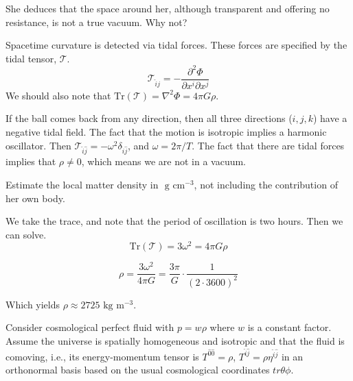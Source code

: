 \documentclass[11pt,largemargins]{homework}
\begin{document}
\begin{alphaparts}
\questionpart
She deduces that the space around her, although transparent and offering no resistance, is not a true vacuum.  Why not?

Spacetime curvature is detected via tidal forces.  These forces are specified by the tidal tensor, $\mathcal{T}$.  $$\mathcal{T}_{\hat{i}\hat{j}} = - \frac{\partial^2 \Phi}{\partial x^i \partial x^j} $$ We should also note that $\mathrm{Tr}(\mathcal{T}) = \nabla^2 \Phi = 4 \pi G \rho$.

If the ball comes back from any direction, then all three directions ($i, j, k$) have a negative tidal field.  The fact that the motion is isotropic implies a harmonic oscillator.  Then $\mathcal{T}_{\hat{i} \hat{j}} = -\omega^2 \delta_{\hat{i} \hat{j}}$, and $\omega = 2\pi / T$.  The fact that there are tidal forces implies that $\rho \neq 0$, which means we are not in a vacuum. 

\questionpart
Estimate the local matter density in $\mbox{ g}\mbox{ cm}^{-3}$, not including the contribution of her own body. 

We take the trace, and note that the period of oscillation is two hours.  Then we can solve.
$$\mathrm{Tr}(\mathcal{T}) = 3 \omega^2 = 4 \pi G \rho$$

$$\rho = \frac{3 \omega^2}{4 \pi G} = \frac{3 \pi}{G} \cdot \frac{1}{(2 \cdot 3600)^2} $$

Which yields
$\rho \approx 2725 \mbox{ kg} \mbox{ m}^{-3}$.

\end{alphaparts}

\question
Consider cosmological perfect fluid with $p = w \rho$ where $w$ is a constant factor.  Assume the universe is spatially homogeneous and isotropic and that the fluid is comoving, i.e., its energy-momentum tensor is $T^{\hat{0}\hat{0}} = \rho$, $T^{\hat{i}\hat{j}} = \rho \eta^{\hat{i}\hat{j}}$ in an orthonormal basis based on the usual cosmological coordinates $t r \theta \phi$. 
\end{document}
